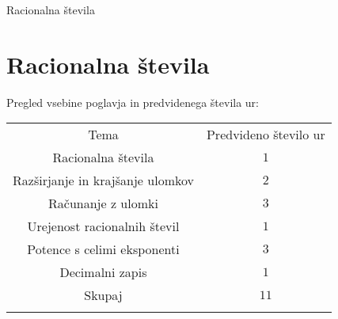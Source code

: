 \begin{priprava}{0}{}{}{Racionalna števila}{}{}
    
    \chapter{Racionalna števila}

    \Large{Pregled vsebine poglavja in predvidenega števila ur:}

    \begin{table}[H]
        \centering
        \begin{tabular}{||c|c||} 
        \hhline{|t:==:t|}
        \rowcolor[rgb]{0.843,0.718,0.718} 
        Tema  & Predvideno število ur   \\ 
        \hhline{|:==:|}
        Racionalna števila & $1$    \\ 
        \hline
        Razširjanje in krajšanje ulomkov & $2$    \\ 
        \hline
        Računanje z ulomki & $3$    \\ 
        \hline
        Urejenost racionalnih števil & $1$     \\
        \hline
        Potence s celimi eksponenti & $3$     \\
        \hline
        Decimalni zapis & $1$    \\ 
        \hhline{|:==:|}
        Skupaj & $11$     \\
        \hhline{|b:==:b|}
        \end{tabular}
    \end{table}


    
\end{priprava}